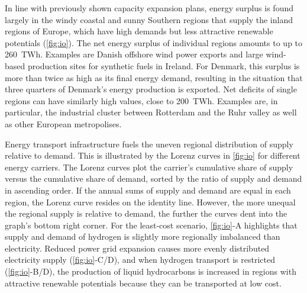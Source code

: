 In line with previously shown capacity expansion plans, energy surplus is found
largely in the windy coastal and sunny Southern regions that supply the inland
regions of Europe, which have high demands but less attractive renewable
potentials (\cref{fig:io}). The net energy surplus of individual regions amounts
to up to 260~TWh. Examples are Danish offshore wind power exports and large
wind-based production sites for synthetic fuels in Ireland. For Denmark, this
surplus is more than twice as high as its final energy demand, resulting in the
situation that three quarters of Denmark's energy production is exported. Net
deficits of single regions can have similarly high values, close to 200~TWh.
Examples are, in particular, the industrial cluster between Rotterdam and the
Ruhr valley as well as other European metropolises.

Energy transport infrastructure fuels the uneven regional distribution of supply
relative to demand. This is illustrated by the Lorenz curves in \cref{fig:io}
for different energy carriers. The Lorenz curves plot the carrier's cumulative
share of supply versus the cumulative share of demand, sorted by the ratio of
supply and demand in ascending order. If the annual sums of supply and demand
are equal in each region, the Lorenz curve resides on the identity line.
However, the more unequal the regional supply is relative to demand, the further
the curves dent into the graph's bottom right corner. For the least-cost
scenario, \cref{fig:io}-A highlights that supply and demand of hydrogen
is slightly more regionally imbalanced than electricity. Reduced power grid
expansion causes more evenly distributed electricity supply
(\cref{fig:io}-C/D), and when hydrogen transport is
restricted (\cref{fig:io}-B/D), the production of
liquid hydrocarbons is increased in regions with attractive renewable potentials
because they can be transported at low cost.

